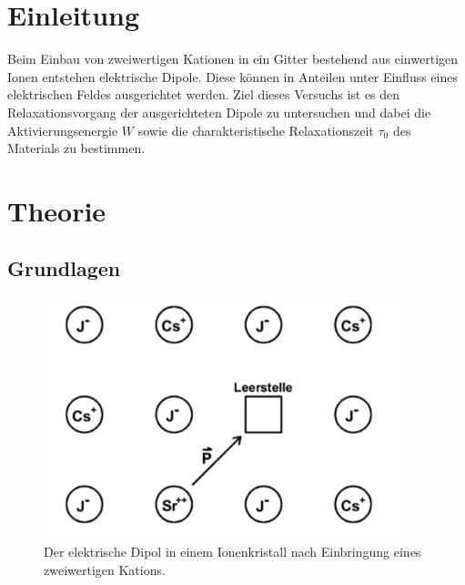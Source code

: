 \section{Einleitung}

Beim Einbau von zweiwertigen Kationen in ein Gitter bestehend aus einwertigen Ionen entstehen elektrische Dipole. Diese können in Anteilen unter Einfluss eines elektrischen Feldes ausgerichtet werden. Ziel dieses Versuchs ist es den Relaxationsvorgang der ausgerichteten Dipole zu untersuchen und dabei die Aktivierungsenergie $W$ sowie die charakteristische Relaxationszeit $\tau_0$ des Materials zu bestimmen.

\section{Theorie}
\label{sec:Theorie}

\subsection{Grundlagen}


\begin{figure}
  \centering
  \includegraphics[height= 7cm]{BestNippelpiercings/gitter.pdf}
  \caption{Der elektrische Dipol in einem Ionenkristall nach Einbringung eines zweiwertigen Kations. \cite{anleitung}}
  \label{fig:gitter}
\end{figure}

